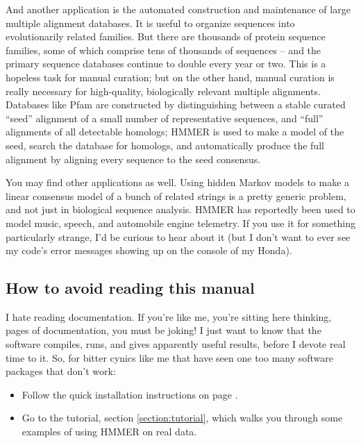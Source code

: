 And another application is the automated construction and maintenance
of large multiple alignment databases.  It is useful to organize
sequences into evolutionarily related families. But there are
thousands of protein sequence families, some of which comprise tens of
thousands of sequences -- and the primary sequence databases continue
to double every year or two. This is a hopeless task for manual
curation; but on the other hand, manual curation is really necessary
for high-quality, biologically relevant multiple alignments. Databases
like Pfam \cite{Bateman02} are constructed by distinguishing between a
stable curated ``seed'' alignment of a small number of representative
sequences, and ``full'' alignments of all detectable homologs; HMMER
is used to make a model of the seed, search the database for homologs,
and automatically produce the full alignment by aligning every
sequence to the seed consensus.

You may find other applications as well. Using hidden Markov models to
make a linear consensus model of a bunch of related strings is a
pretty generic problem, and not just in biological sequence analysis.
HMMER has reportedly been used to model music, speech, and automobile
engine telemetry. If you use it for something particularly strange,
I'd be curious to hear about it (but I don't want to ever see my
code's error messages showing up on the console of my Honda).

\subsection{How to avoid reading this manual}

I hate reading documentation. If you're like me, you're sitting here
thinking, \pageref{manualend} pages of documentation, you must be
joking! I just want to know that the software compiles, runs, and
gives apparently useful results, before I devote real time to it. So,
for bitter cynics like me that have seen one too many software
packages that don't work:

\begin{itemize}
\item Follow the quick installation instructions on page
      \pageref{section:installation}. 
\item Go to the tutorial, section \ref{section:tutorial},
      which walks you through some examples of using HMMER
      on real data.
\end{itemize}







